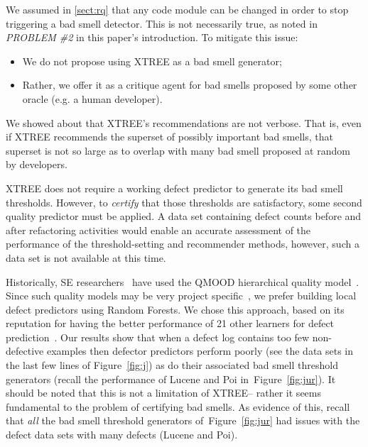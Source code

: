 \documentclass{sig-alternate}
\newcommand{\tion}[1]{\textsection\ref{sect:#1}}
\newcommand{\fig}[1]{Figure~\ref{fig:#1}}
\theoremstyle{break}
\begin{document}
\begin{itemize}
We assumed in \tion{rq}
that any code module can be changed in order
to stop triggering a bad smell detector. This is not necessarily
true, as noted in {\em PROBLEM \#2} in this paper's introduction.
To mitigate this issue:
\begin{itemize}
    \item We do not propose using XTREE as a bad
smell generator;
\item Rather, we offer it as  a critique agent for bad smells
proposed by some other oracle (e.g. a human developer).
\end{itemize}
We showed about that XTREE's recommendations are not verbose.
That is, even if XTREE recommends the superset of possibly important bad smells,
that superset is not so large as to  overlap with many
 bad smell proposed at random 
by   developers. 

XTREE does not require a working defect predictor to generate
its bad smell thresholds. However, to {\em certify}
that those thresholds are satisfactory, some
second quality predictor must be applied. A data set containing defect counts before and after refactoring activities would enable an accurate assessment of the performance of the threshold-setting and recommender methods, however, such a data set is not available at this time.

 Historically,
SE researchers~\cite{Cheng10,OKeeffe08,OKeeffe07,Moghadam2011,Mkaouer14} have used the QMOOD hierarchical quality model~\cite{Bansiya02}.
Since such quality models may be very project specific~\cite{localvsglobal}, we prefer building local 
defect predictors using Random Forests. We chose this approach,  based on its reputation for having the better  performance of 21 other learners for defect prediction~\cite{lessmann}.  
Our results show that when a defect log contains too few
non-defective examples then defector predictors
perform poorly (see the data sets in the last few lines of \fig{j})
as do their associated bad smell threshold generators
(recall the performance of Lucene and Poi in~\fig{jur}). It should be noted that this is not a limitation of XTREE-- rather
it seems fundamental to the problem of certifying bad smells.
As evidence of this, recall that {\em all} the bad smell threshold generators of~\fig{jur}
had issues with the defect data sets with  many defects
(Lucene and Poi).



\end{itemize}
\end{document}
